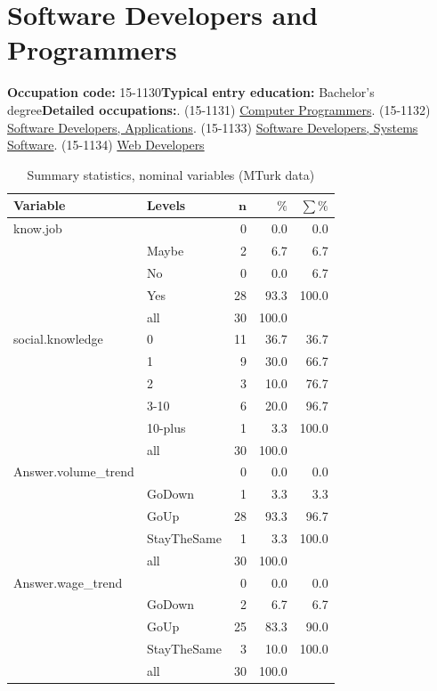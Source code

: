\documentclass[a4paper,10pt]{article}\usepackage[]{graphicx}\usepackage[]{color}
\begin{document}
\newpage\section{Software Developers and Programmers}\textbf{Occupation code:} 15-1130\newline\textbf{Typical entry education:} Bachelor's degree\newline\textbf{Detailed occupations:}. (15-1131)  \href{http://www.bls.gov/oes/current/oes151131.htm}{Computer Programmers}. (15-1132)  \href{http://www.bls.gov/oes/current/oes151132.htm}{Software Developers, Applications}. (15-1133)  \href{http://www.bls.gov/oes/current/oes151133.htm}{Software Developers, Systems Software}. (15-1134)  \href{http://www.bls.gov/oes/current/oes151134.htm}{Web Developers}\newline%
\begin{table}[ht]
\centering
{\footnotesize
\begin{tabular}{ll|rrr}
 \textbf{Variable} & \textbf{Levels} & $\mathbf{n}$ & $\mathbf{\%}$ & $\mathbf{\sum \%}$ \\ 
  \hline
know.job &  & 0 & 0.0 & 0.0 \\ 
   & Maybe & 2 & 6.7 & 6.7 \\ 
   & No & 0 & 0.0 & 6.7 \\ 
   & Yes & 28 & 93.3 & 100.0 \\ 
   \hline
 & all & 30 & 100.0 &  \\ 
   \hline
\hline
social.knowledge & 0 & 11 & 36.7 & 36.7 \\ 
   & 1 & 9 & 30.0 & 66.7 \\ 
   & 2 & 3 & 10.0 & 76.7 \\ 
   & 3-10 & 6 & 20.0 & 96.7 \\ 
   & 10-plus & 1 & 3.3 & 100.0 \\ 
   \hline
 & all & 30 & 100.0 &  \\ 
   \hline
\hline
Answer.volume\_trend &  & 0 & 0.0 & 0.0 \\ 
   & GoDown & 1 & 3.3 & 3.3 \\ 
   & GoUp & 28 & 93.3 & 96.7 \\ 
   & StayTheSame & 1 & 3.3 & 100.0 \\ 
   \hline
 & all & 30 & 100.0 &  \\ 
   \hline
\hline
Answer.wage\_trend &  & 0 & 0.0 & 0.0 \\ 
   & GoDown & 2 & 6.7 & 6.7 \\ 
   & GoUp & 25 & 83.3 & 90.0 \\ 
   & StayTheSame & 3 & 10.0 & 100.0 \\ 
   \hline
 & all & 30 & 100.0 &  \\ 
   \hline
\hline
\end{tabular}
}
\caption{Summary statistics, nominal variables (MTurk data)} 
\label{tab1:15-1130}
\end{table}
\end{document}
